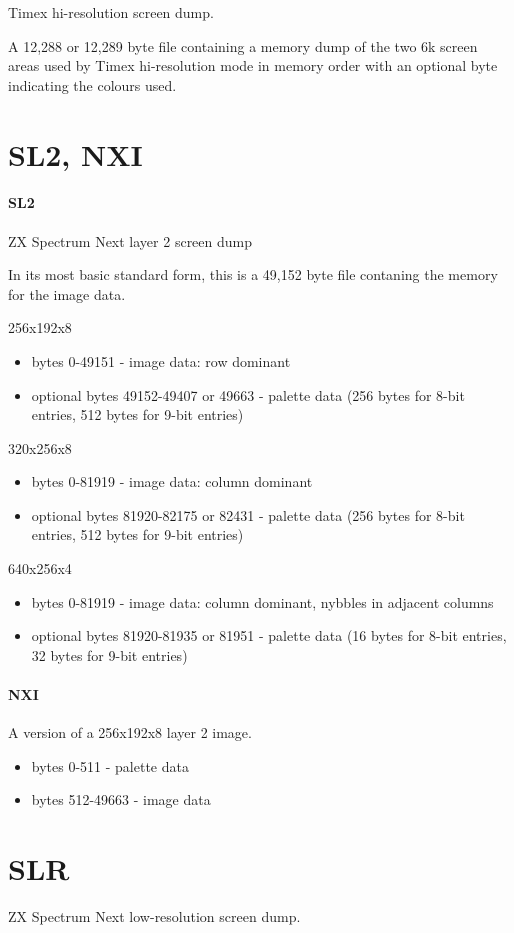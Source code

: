 Timex hi-resolution screen dump.

A 12,288 or 12,289 byte file containing a memory dump of the two 6k
screen areas used by Timex hi-resolution mode in memory order with an
optional byte indicating the colours used.
\section{SL2, NXI}
\paragraph{SL2}
ZX Spectrum Next layer 2 screen dump

In its most basic standard form, this is a 49,152 byte file contaning
the memory for the image data. 

256x192x8
\begin{itemize}
\item bytes 0-49151 - image data: row dominant
\item optional bytes 49152-49407 or 49663 - palette data (256 bytes
  for 8-bit entries, 512 bytes for 9-bit entries)
\end{itemize}
320x256x8
\begin{itemize}
\item bytes 0-81919 - image data: column dominant
\item optional bytes 81920-82175 or 82431 - palette data (256 bytes
  for 8-bit entries, 512 bytes for 9-bit entries)
\end{itemize}
640x256x4
\begin{itemize}
\item bytes 0-81919 - image data: column dominant, nybbles in adjacent columns
\item optional bytes 81920-81935 or 81951 - palette data (16 bytes for
  8-bit entries, 32 bytes for 9-bit entries)
\end{itemize}

\paragraph{NXI}
A version of a 256x192x8 layer 2 image.
\begin{itemize}
\item bytes 0-511 - palette data
\item bytes 512-49663 - image data
\end{itemize}
\section{SLR}
ZX Spectrum Next low-resolution screen dump.


